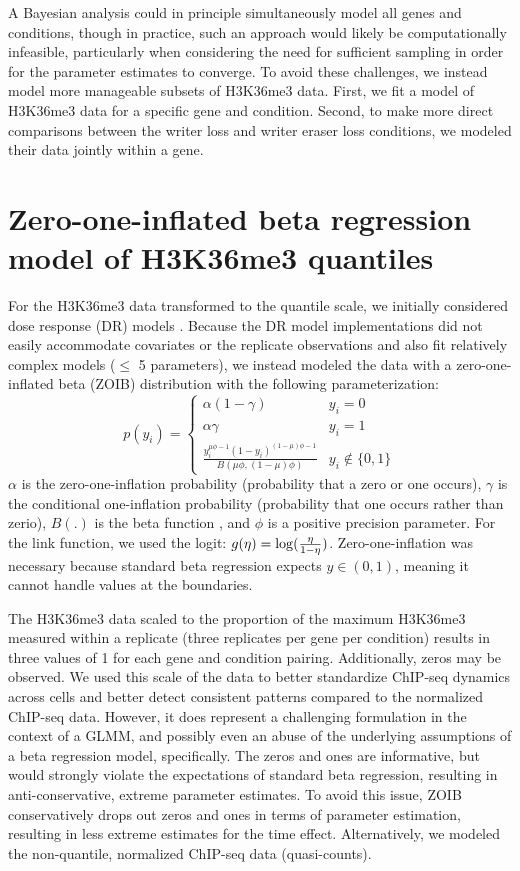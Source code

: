 \documentclass[12pt]{extarticle}
\begin{document}
A Bayesian analysis could in principle simultaneously model all genes and conditions, though in practice, such an approach would likely be computationally infeasible, particularly when considering the need for sufficient sampling in order for the parameter estimates to converge. To avoid these challenges, we instead model more manageable subsets of H3K36me3 data. First, we fit a model of H3K36me3 data for a specific gene and condition. Second, to make more direct comparisons between the writer loss and writer eraser loss conditions, we modeled their data jointly within a gene.
	
\section*{Zero-one-inflated beta regression model of H3K36me3 quantiles}
For the H3K36me3 data transformed to the quantile scale, we initially considered dose response (DR) models \cite{Slob2002, Wilson2014}. Because the DR model implementations did not easily accommodate covariates or the replicate observations and also fit relatively complex models ($\le$ 5 parameters), we instead modeled the data with a zero-one-inflated beta (ZOIB) distribution with the following parameterization:
\begin{equation}
	p(y_{i}) = \begin{cases} 
      			\alpha(1 - \gamma) & y_{i} = 0 \\
      			\alpha \gamma & y_{i} = 1 \\
     			 \frac{y_{i}^{\mu\phi - 1}(1 - y_{i})^{(1 - \mu)\phi - 1}}{B(\mu \phi, (1 - \mu)\phi)} & y_{i} \not\in \{0, 1\}
   		\end{cases}
\end{equation}
$\alpha$ is the zero-one-inflation probability (probability that a zero or one occurs), $\gamma$ is the conditional one-inflation probability (probability that one occurs rather than zerio), $B(.)$ is the beta function \cite{Casella2002}, and $\phi$ is a positive precision parameter. For the link function, we used the logit: $g(\eta)= \log\large(\frac{\eta}{1 - \eta}\large)$. Zero-one-inflation was necessary because standard beta regression expects $y \in (0, 1)$, meaning it cannot handle values at the boundaries.

The H3K36me3 data scaled to the proportion of the maximum H3K36me3 measured within a replicate (three replicates per gene per condition) results in three values of 1 for each gene and condition pairing. Additionally, zeros may be observed. We used this scale of the data to better standardize ChIP-seq dynamics across cells and better detect consistent patterns compared to the normalized ChIP-seq data. However, it does represent a challenging formulation in the context of a GLMM, and possibly even an abuse of the underlying assumptions of a beta regression model, specifically. The zeros and ones are informative, but would strongly violate the expectations of standard beta regression, resulting in anti-conservative, extreme parameter estimates. To avoid this issue, ZOIB conservatively drops out zeros and ones in terms of parameter estimation, resulting in less extreme estimates for the time effect. Alternatively, we modeled the non-quantile, normalized ChIP-seq data (quasi-counts).
\end{document}
